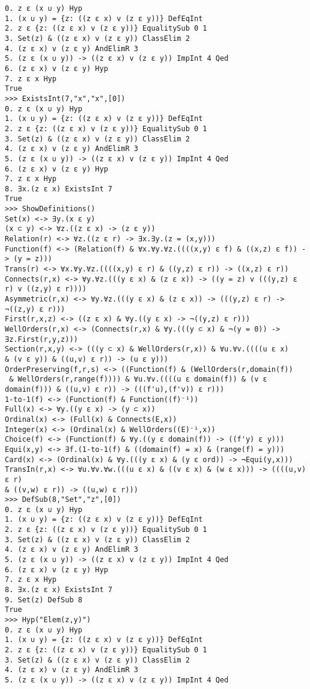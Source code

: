 \documentclass[12pt,leqno]{article}
\numberwithin{equation}{section}
\begin{document}
\begin{verbatim}
0. z ε (x ∪ y) Hyp 
1. (x ∪ y) = {z: ((z ε x) v (z ε y))} DefEqInt 
2. z ε {z: ((z ε x) v (z ε y))} EqualitySub 0 1
3. Set(z) & ((z ε x) v (z ε y)) ClassElim 2
4. (z ε x) v (z ε y) AndElimR 3
5. (z ε (x ∪ y)) -> ((z ε x) v (z ε y)) ImpInt 4 Qed
6. (z ε x) v (z ε y) Hyp 
7. z ε x Hyp 
True
>>> ExistsInt(7,"x","x",[0])
0. z ε (x ∪ y) Hyp 
1. (x ∪ y) = {z: ((z ε x) v (z ε y))} DefEqInt 
2. z ε {z: ((z ε x) v (z ε y))} EqualitySub 0 1
3. Set(z) & ((z ε x) v (z ε y)) ClassElim 2
4. (z ε x) v (z ε y) AndElimR 3
5. (z ε (x ∪ y)) -> ((z ε x) v (z ε y)) ImpInt 4 Qed
6. (z ε x) v (z ε y) Hyp 
7. z ε x Hyp 
8. ∃x.(z ε x) ExistsInt 7
True
>>> ShowDefinitions()
Set(x) <-> ∃y.(x ε y)
(x ⊂ y) <-> ∀z.((z ε x) -> (z ε y))
Relation(r) <-> ∀z.((z ε r) -> ∃x.∃y.(z = (x,y)))
Function(f) <-> (Relation(f) & ∀x.∀y.∀z.((((x,y) ε f) & ((x,z) ε f)) -> (y = z)))
Trans(r) <-> ∀x.∀y.∀z.((((x,y) ε r) & ((y,z) ε r)) -> ((x,z) ε r))
Connects(r,x) <-> ∀y.∀z.(((y ε x) & (z ε x)) -> ((y = z) v (((y,z) ε r) v ((z,y) ε r))))
Asymmetric(r,x) <-> ∀y.∀z.(((y ε x) & (z ε x)) -> (((y,z) ε r) -> ¬((z,y) ε r)))
First(r,x,z) <-> ((z ε x) & ∀y.((y ε x) -> ¬((y,z) ε r)))
WellOrders(r,x) <-> (Connects(r,x) & ∀y.(((y ⊂ x) & ¬(y = 0)) -> ∃z.First(r,y,z)))
Section(r,x,y) <-> (((y ⊂ x) & WellOrders(r,x)) & ∀u.∀v.((((u ε x) 
& (v ε y)) & ((u,v) ε r)) -> (u ε y)))
OrderPreserving(f,r,s) <-> ((Function(f) & (WellOrders(r,domain(f))
 & WellOrders(r,range(f)))) & ∀u.∀v.((((u ε domain(f)) & (v ε domain(f))) & ((u,v) ε r)) -> (((f'u),(f'v)) ε r)))
1-to-1(f) <-> (Function(f) & Function((f)⁻¹))
Full(x) <-> ∀y.((y ε x) -> (y ⊂ x))
Ordinal(x) <-> (Full(x) & Connects(E,x))
Integer(x) <-> (Ordinal(x) & WellOrders((E)⁻¹,x))
Choice(f) <-> (Function(f) & ∀y.((y ε domain(f)) -> ((f'y) ε y)))
Equi(x,y) <-> ∃f.(1-to-1(f) & ((domain(f) = x) & (range(f) = y)))
Card(x) <-> (Ordinal(x) & ∀y.(((y ε x) & (y ε ord)) -> ¬Equi(y,x)))
TransIn(r,x) <-> ∀u.∀v.∀w.(((u ε x) & ((v ε x) & (w ε x))) -> ((((u,v) ε r) 
& ((v,w) ε r)) -> ((u,w) ε r)))
>>> DefSub(8,"Set","z",[0])
0. z ε (x ∪ y) Hyp 
1. (x ∪ y) = {z: ((z ε x) v (z ε y))} DefEqInt 
2. z ε {z: ((z ε x) v (z ε y))} EqualitySub 0 1
3. Set(z) & ((z ε x) v (z ε y)) ClassElim 2
4. (z ε x) v (z ε y) AndElimR 3
5. (z ε (x ∪ y)) -> ((z ε x) v (z ε y)) ImpInt 4 Qed
6. (z ε x) v (z ε y) Hyp 
7. z ε x Hyp 
8. ∃x.(z ε x) ExistsInt 7
9. Set(z) DefSub 8
True
>>> Hyp("Elem(z,y)")
0. z ε (x ∪ y) Hyp 
1. (x ∪ y) = {z: ((z ε x) v (z ε y))} DefEqInt 
2. z ε {z: ((z ε x) v (z ε y))} EqualitySub 0 1
3. Set(z) & ((z ε x) v (z ε y)) ClassElim 2
4. (z ε x) v (z ε y) AndElimR 3
5. (z ε (x ∪ y)) -> ((z ε x) v (z ε y)) ImpInt 4 Qed

\end{verbatim}
\end{document}
